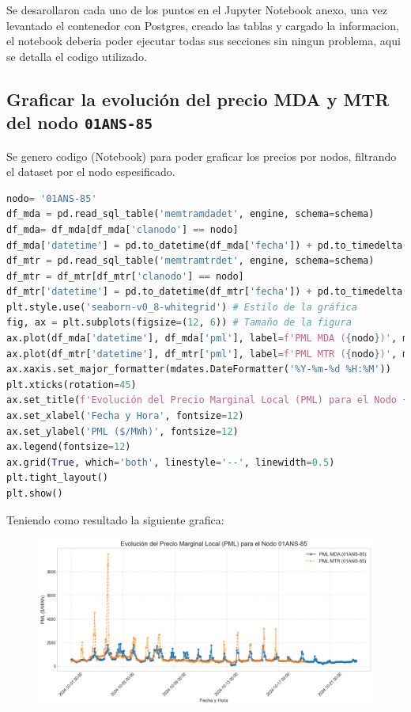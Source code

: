 \documentclass[11pt, a4paper]{article}
\begin{document}
Se desarollaron cada uno de los puntos en el Jupyter Notebook anexo, una vez levantado el contenedor con Postgres, creado las tablas y cargado la informacion, el notebook deberia poder ejecutar todas sus secciones sin ningun problema, aqui se detalla el codigo utilizado.

\subsection{Graficar la evolución del precio MDA y MTR del nodo \texttt{01ANS-85}}

Se genero codigo (Notebook) para poder graficar los precios por nodos, filtrando el dataset por el nodo espesificado. 

\begin{lstlisting}[language=Python]
nodo= '01ANS-85'
df_mda = pd.read_sql_table('memtramdadet', engine, schema=schema)
df_mda= df_mda[df_mda['clanodo'] == nodo]
df_mda['datetime'] = pd.to_datetime(df_mda['fecha']) + pd.to_timedelta(df_mda['hora'], unit='h')
df_mtr = pd.read_sql_table('memtramtrdet', engine, schema=schema)
df_mtr = df_mtr[df_mtr['clanodo'] == nodo]
df_mtr['datetime'] = pd.to_datetime(df_mtr['fecha']) + pd.to_timedelta(df_mtr['hora'], unit='h')
plt.style.use('seaborn-v0_8-whitegrid') # Estilo de la gráfica
fig, ax = plt.subplots(figsize=(12, 6)) # Tamaño de la figura
ax.plot(df_mda['datetime'], df_mda['pml'], label=f'PML MDA ({nodo})', marker='o', linestyle='-', markersize=4)
ax.plot(df_mtr['datetime'], df_mtr['pml'], label=f'PML MTR ({nodo})', marker='x', linestyle='--', markersize=4, alpha=0.8)
ax.xaxis.set_major_formatter(mdates.DateFormatter('%Y-%m-%d %H:%M'))
plt.xticks(rotation=45)
ax.set_title(f'Evolución del Precio Marginal Local (PML) para el Nodo {nodo}', fontsize=16)
ax.set_xlabel('Fecha y Hora', fontsize=12)
ax.set_ylabel('PML ($/MWh)', fontsize=12)
ax.legend(fontsize=12)
ax.grid(True, which='both', linestyle='--', linewidth=0.5)
plt.tight_layout()
plt.show()
\end{lstlisting}

Teniendo como resultado la siguiente grafica:
\begin{figure}[h!]
  \centering
  \includegraphics[width=\textwidth,keepaspectratio]{1_gra_ev_mda_mtr_nodo.png}
\end{figure}
\end{document}
